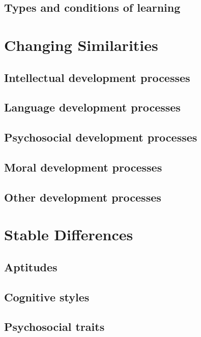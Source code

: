 \documentclass[12pt]{report} %
\begin{document}
\subsection{Types and conditions of learning}


\section{Changing Similarities}

\subsection{Intellectual development processes}

\subsection{Language development processes}

\subsection{Psychosocial development processes}

\subsection{Moral development processes}

\subsection{Other development processes}


\section{Stable Differences}

\subsection{Aptitudes}

\subsection{Cognitive styles}

\subsection{Psychosocial traits}
\end{document}
